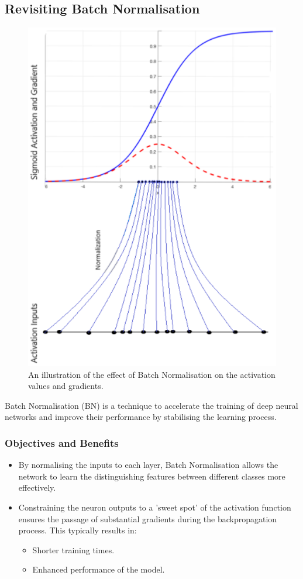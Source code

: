\subsection{Revisiting Batch Normalisation}
\begin{figure}[H]
    \centering
    \includegraphics[width=0.4\linewidth]{img/sigmoid_bn.png}
     \caption{An illustration of the effect of Batch Normalisation on the activation values and gradients.}
\end{figure}

Batch Normalisation (BN) is a technique to accelerate the training of deep neural networks and improve their performance by stabilising the learning process.

\subsubsection*{Objectives and Benefits}
\begin{itemize}
    \item By normalising the inputs to each layer, Batch Normalisation allows the network to learn the distinguishing features between different classes more effectively.
    \item Constraining the neuron outputs to a 'sweet spot' of the activation function ensures the passage of substantial gradients during the backpropagation process. This typically results in:
    \begin{itemize}
        \item Shorter training times.
        \item Enhanced performance of the model.
    \end{itemize}
\end{itemize}

